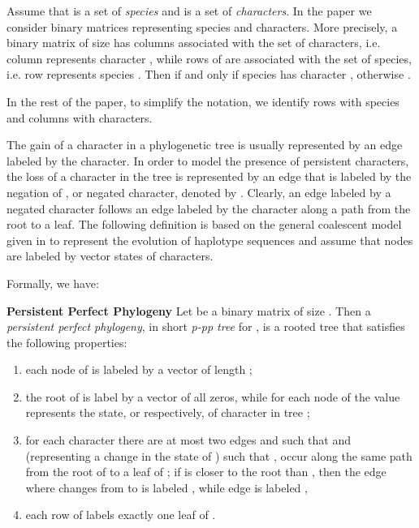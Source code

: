 \documentclass{llncs}
\begin{document}
 Assume that  is a
set of {\em species} and  is a set of
{\em characters}. In the paper we consider binary matrices representing
species and characters. More precisely,    a binary matrix
 of size  has columns associated with the set
 of characters, i.e. column  represents character , while rows of  are associated with the set  of
species, i.e. row  represents species . Then 
if and only if species  has character , otherwise . 

In the rest of the paper,  to simplify the notation, we identify rows with species and columns with characters.


The gain of a character in a  phylogenetic tree is usually represented by an edge labeled by the character.   In order to  model  the presence of persistent
characters, the loss of a
character   in the tree is represented  by  an edge that  is labeled by the negation of , or negated character, denoted by  .   Clearly, an edge labeled by a negated character  follows  an edge labeled by the  character along a path from the root to a leaf.  
 The following definition is based on the  general  coalescent model given in \cite{EHK} to  represent the evolution of    haplotype sequences and assume that nodes are labeled by vector states of characters.



Formally, we have:

{\bf Persistent Perfect Phylogeny}
Let   be a binary matrix of size . Then a {\it
persistent perfect phylogeny}, in short  {\em  p-pp tree} for , is a rooted tree 
that satisfies the following properties:

\begin{enumerate}

\item each node  of  is labeled by a vector  of length ;

\item  the root of  is label  by a vector of all zeros,  while  for each  node  of  
the value  represents  the state,   or  respectively, of character  in tree ;

\item   for each character  there are at most  two  edges  and  
such that  and  
(representing a change in the state of ) such that ,   occur along the same path 
from the root of  to a leaf of ; if  is closer to the root than , then 
 the  edge  where  changes from  to  is labeled , 
while  edge  is labeled ,

\item  each row  of   labels exactly one leaf of .

\end{enumerate}
\end{document}
